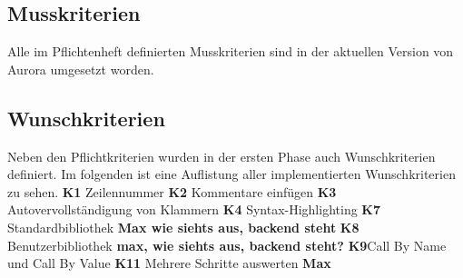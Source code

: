 \documentclass[parskip=full,11pt,twoside]{scrartcl}
\begin{document}
\subsection{Musskriterien}
Alle im Pflichtenheft definierten Musskriterien sind in der aktuellen Version von Aurora umgesetzt worden.

\subsection{Wunschkriterien}
Neben den Pflichtkriterien wurden in der ersten Phase auch Wunschkriterien definiert.
Im folgenden ist eine Auflistung aller implementierten Wunschkriterien zu sehen.
\newline
\newline
\textbf{K1} Zeilennummer
\newline
\textbf{K2} Kommentare einfügen
\newline
\textbf{K3} Autovervollständigung von Klammern
\newline
\textbf{K4} Syntax-Highlighting
\newline
\textbf{K7} Standardbibliothek \textbf{Max wie siehts aus, backend steht}
\newline
\textbf{K8} Benutzerbibliothek \textbf{max, wie siehts aus, backend steht?}
\bigbreak
\textbf{K9}Call By Name und Call By Value
\smallbreak
\textbf{K11} Mehrere Schritte auswerten \textbf{Max}
\newline
\newpage

\end{document}
